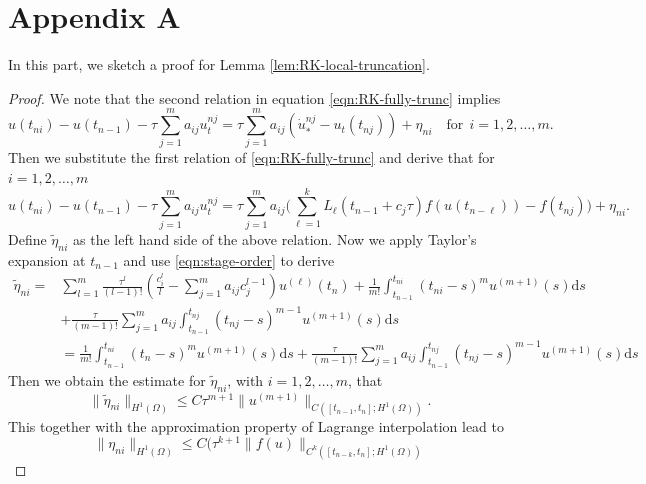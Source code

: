 \documentclass[10pt,final,leqno,onefignum,onetabnum]{siamltex}%
\def\d{\textrm{d}}
\def\leq{\leqslant}
\def\l{\left}
\def\r{\right}
\def\d{\mathrm{d}}
\def\II{(\Omega)}
\begin{document}
 


\appendix

\section*{Appendix A}\label{sec:appendixA}
In this part, we sketch a proof for Lemma \ref{lem:RK-local-truncation}.
\begin{proof}
We note that the second relation in equation \eqref{eqn:RK-fully-trunc} implies
\begin{equation*}
 u(t_{ni}) -   u(t_{n-1}) -\tau\sum_{j=1}^m a_{ij}  u_t^{nj} =
 \tau \sum_{j=1}^m a_{ij} (\dot u_*^{nj} - u_t(t_{nj}))+
 \eta_{ni}\quad \text{for} ~~i=1,2,\dots,m.
\end{equation*}
Then we substitute the first relation of \eqref{eqn:RK-fully-trunc} and derive that
for $i=1,2,\dots,m$
\begin{equation*}
 u(t_{ni}) -   u(t_{n-1}) -\tau\sum_{j=1}^m a_{ij}  u_t^{nj} =
 \tau \sum_{j=1}^m a_{ij}   \Big(\sum_{\ell=1}^k L_{\ell}(t_{n-1}+c_j\tau) f(u(t_{n-\ell})) - f(t_{nj})\Big)+
 \eta_{ni}.
\end{equation*}
Define $\tilde\eta_{ni}$ as the left hand side of the above relation. %
Now we apply Taylor's expansion at $t_{n-1}$  and use \eqref{eqn:stage-order} to derive
\begin{equation*}
\begin{aligned}
\tilde\eta_{ni} =& \sum_{l=1}^{m}\frac{\tau^l}{(l-1)!}\l(\frac{c_i^l}l -
\sum_{j=1}^ma_{ij}c_j^{l-1}\r)u^{(\ell)}(t_n) +
\frac1{m!}\int_{t_{n-1}}^{t_{ni}} (t_{ni}-s)^{m} u^{(m+1)}(s) \d s \\
&+ \frac\tau{(m-1)!}\sum_{j=1}^ma_{ij}\int_{t_{n-1}}^{t_{nj}}
(t_{nj}-s)^{m-1} u^{(m+1)}(s) \d s\\
&=\frac1{m!}\int_{t_{n-1}}^{t_{ni}} (t_n-s)^{m} u^{(m+1)}(s) \d s
+ \frac\tau{(m-1)!}\sum_{j=1}^ma_{ij}\int_{t_{n-1}}^{t_{nj}}
(t_{nj}-s)^{m-1} u^{(m+1)}(s) \d s
\end{aligned}
\end{equation*}
Then we obtain the estimate for $\tilde\eta_{ni}$, with $i=1,2,\dots,m$, that
\begin{equation*}
\|\tilde\eta_{ni}\|_{H^1(\Omega)} \leq C\tau^{m+1} \|u^{(m+1)}\|_{C([t_{n-1},t_n];H^1(\Omega))}.
\end{equation*}
This together with the approximation property of Lagrange interpolation lead to
\begin{equation*}
    \|\eta_{ni}\|_{H^1(\Omega)} \leq C\Big(\tau^{k+1} \| f(u)  \|_{C^{k}([t_{n-k},t_n]; H^1\II)}

\end{equation*}
\end{proof}
\end{document}
